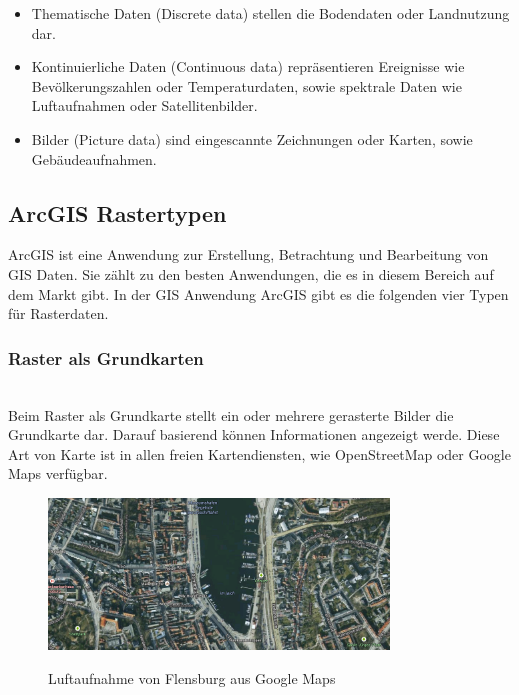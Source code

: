 \documentclass[10pt,conference,compsocconf]{IEEEtran}
\begin{document}
\begin{itemize}
  \item Thematische Daten (Discrete data) stellen die Bodendaten oder Landnutzung dar.
  \item Kontinuierliche Daten (Continuous data) repräsentieren Ereignisse wie Bevölkerungszahlen oder Temperaturdaten, sowie spektrale Daten wie Luftaufnahmen oder Satellitenbilder.
  \item Bilder (Picture data) sind eingescannte Zeichnungen oder Karten, sowie Gebäudeaufnahmen.\\
\end{itemize}

\subsection{ArcGIS Rastertypen}
ArcGIS ist eine Anwendung zur Erstellung, Betrachtung und Bearbeitung von GIS Daten. Sie zählt zu den besten Anwendungen, die es in diesem Bereich auf dem Markt gibt. In der GIS Anwendung ArcGIS gibt es die folgenden vier Typen für Rasterdaten.\\

\subsubsection{Raster als Grundkarten}\hspace*{\fill} \\
Beim Raster als Grundkarte stellt ein oder mehrere gerasterte Bilder die Grundkarte dar. Darauf basierend können Informationen angezeigt werde. Diese Art von Karte ist in allen freien Kartendiensten, wie OpenStreetMap oder Google Maps verfügbar.
\begin{figure}[H]
  \centering
  	\includegraphics[height=114pt]{img/gis_Flensburg_raster}\\
  \caption[]{Luftaufnahme von Flensburg aus Google Maps}
  \label{img:gis_Flensburg_raster}
\end{figure}
\end{document}

